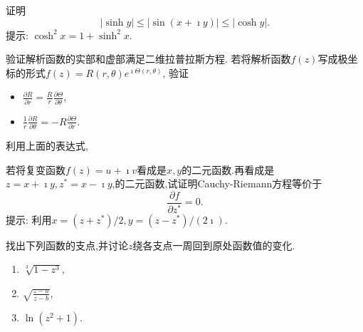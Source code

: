 \documentclass[10pt]{article}
\newenvironment{problem}[2][]{\begin{trivlist}
\item[\hskip \labelsep {\bfseries #1}\hskip \labelsep {\bfseries #2}]}{\end{trivlist}}
\begin{document}
\renewcommand{\labelenumi}{(\arabic{enumi})}
\renewcommand{\labelenumii}{(\arabic{enumi}.\arabic{enumii})}



 

\begin{problem}{1.1}
  证明
  $$
  |\sinh{y}| \leq |\sin(x+\imath y)| \leq |\cosh{y}|.
  $$
  提示: $\cosh^2{x} = 1+\sinh^2{x}$.
  \end{problem}

  
\begin{problem}{1.2}
验证解析函数的实部和虚部满足二维拉普拉斯方程. 若将解析函数$f(z)$写成极坐标的形式$f(z) = R(r,\theta) e^{\imath \Theta(r,\theta)}$,
验证
\begin{itemize}
\item $\frac{\partial R}{\partial r}=\frac{R}{r} \frac{\partial \Theta}{\partial \theta}$,
\item $\frac{1}{r} \frac{\partial R}{\partial \theta}=-R \frac{\partial \Theta}{\partial r}$.
\end{itemize}
利用上面的表达式,
\end{problem}

\begin{problem}{1.3}
  若将复变函数$f(z)=u+\imath v$看成是$x,y$的二元函数.再看成是$z=x+\imath y, z^*= x-\imath y$,的二元函数,试证明Cauchy-Riemann方程等价于
  $$
  \frac{\partial f}{\partial z^{*}} = 0.
  $$ 
  提示: 利用$x=(z+z^*)/2, y=(z-z^*)/(2\imath)$.
\end{problem}

\begin{problem}{1.4}
  找出下列函数的支点,并讨论$z$绕各支点一周回到原处函数值的变化.
  \begin{enumerate}
    \item $\sqrt[3]{1-z^3}$,
    \item $\sqrt{\frac{z-a}{z-b}}$,
    \item $\ln{(z^2 + 1)}$.
  \end{enumerate}

\end{problem}
\end{document}
